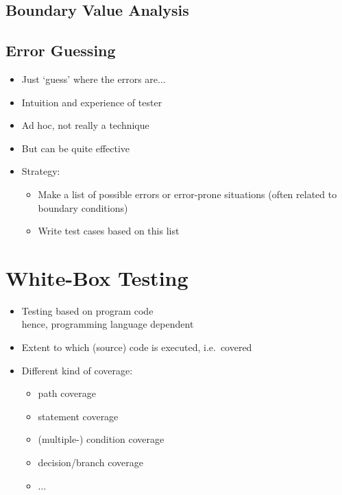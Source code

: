 			
\subsection{Boundary Value Analysis}
		
\subsection{Error Guessing}
			
\begin{itemize}
	\item Just ‘guess’ where the errors are$\ldots$
	\item Intuition and experience of tester
	\item Ad hoc, not really a technique
	\item But can be quite effective
	\item Strategy:
	\begin{itemize}
		\item Make a list of possible errors or error-prone situations (often related to boundary conditions)
		\item Write test cases based on this list
	\end{itemize}
\end{itemize}
			
\section{White-Box Testing}
		
\begin{itemize}
	\itemsep0em
	\item Testing based on program code\\
	hence, programming language dependent
	\item Extent to which (source) code is executed, i.e.\ covered
	\item Different kind of coverage:
	\begin{itemize}
		\itemsep0em
		\item path coverage
		\item statement coverage
		\item (multiple-) condition coverage
		\item decision/branch coverage
		\item $\ldots$
	\end{itemize}			
\end{itemize}
			
